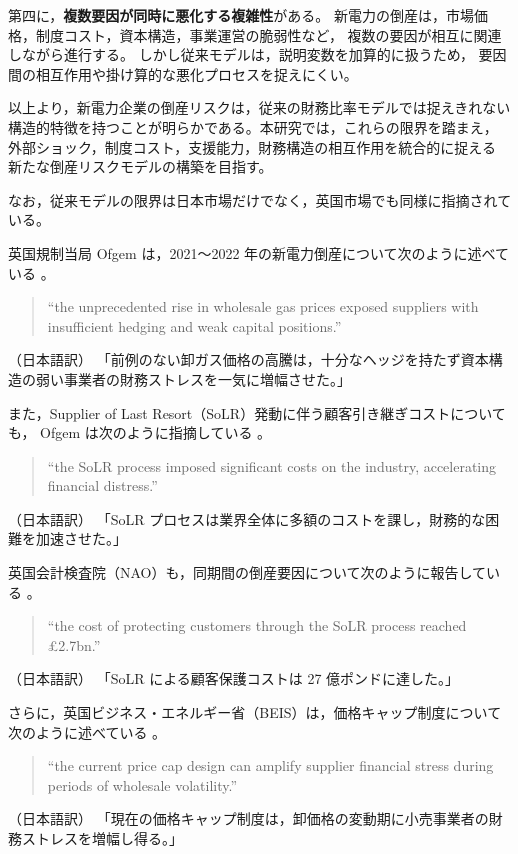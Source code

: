 第四に，\textbf{複数要因が同時に悪化する複雑性}がある。
新電力の倒産は，市場価格，制度コスト，資本構造，事業運営の脆弱性など，
複数の要因が相互に関連しながら進行する。
しかし従来モデルは，説明変数を加算的に扱うため，
要因間の相互作用や掛け算的な悪化プロセスを捉えにくい。

以上より，新電力企業の倒産リスクは，従来の財務比率モデルでは捉えきれない
構造的特徴を持つことが明らかである。本研究では，これらの限界を踏まえ，
外部ショック，制度コスト，支援能力，財務構造の相互作用を統合的に捉える
新たな倒産リスクモデルの構築を目指す。

なお，従来モデルの限界は日本市場だけでなく，英国市場でも同様に指摘されている。

英国規制当局 Ofgem は，2021～2022 年の新電力倒産について次のように述べている \parencite{Ofgem2022SupplierFailures}。
\begin{quote}
“the unprecedented rise in wholesale gas prices exposed suppliers with insufficient hedging and weak capital positions.”
\end{quote}
（日本語訳）  
「前例のない卸ガス価格の高騰は，十分なヘッジを持たず資本構造の弱い事業者の財務ストレスを一気に増幅させた。」

また，Supplier of Last Resort（SoLR）発動に伴う顧客引き継ぎコストについても，
Ofgem は次のように指摘している \parencite{Ofgem2022SupplierFailures}。
\begin{quote}
“the SoLR process imposed significant costs on the industry, accelerating financial distress.”
\end{quote}
（日本語訳）  
「SoLR プロセスは業界全体に多額のコストを課し，財務的な困難を加速させた。」

英国会計検査院（NAO）も，同期間の倒産要因について次のように報告している \parencite{NAO2022SupplierFailures}。
\begin{quote}
“the cost of protecting customers through the SoLR process reached £2.7bn.”
\end{quote}
（日本語訳）  
「SoLR による顧客保護コストは 27 億ポンドに達した。」

さらに，英国ビジネス・エネルギー省（BEIS）は，価格キャップ制度について次のように述べている \parencite{BEIS2022RetailStrategy}。
\begin{quote}
“the current price cap design can amplify supplier financial stress during periods of wholesale volatility.”
\end{quote}
（日本語訳）  
「現在の価格キャップ制度は，卸価格の変動期に小売事業者の財務ストレスを増幅し得る。」

